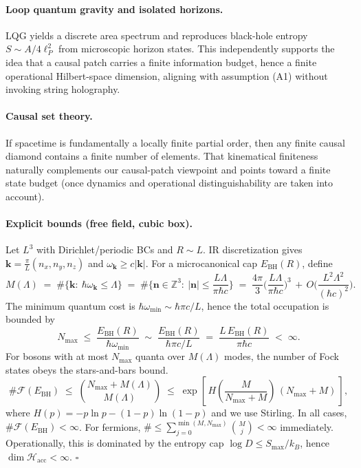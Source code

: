 \documentclass[12pt]{article}
\newcommand{\Smax}{S_{\max}}
\theoremstyle{remark}
\begin{document}
\paragraph{Loop quantum gravity and isolated horizons.}
LQG yields a discrete area spectrum and reproduces black-hole entropy $S\!\sim\!A/4\ell_P^2$ from microscopic horizon states. This independently supports the idea that a causal patch carries a finite information budget, hence a finite operational Hilbert-space dimension, aligning with assumption (A1) without invoking string holography.

\paragraph{Causal set theory.}
If spacetime is fundamentally a locally finite partial order, then any finite causal diamond contains a finite number of elements. That kinematical finiteness naturally complements our causal-patch viewpoint and points toward a finite state budget (once dynamics and operational distinguishability are taken into account).

\paragraph{Explicit bounds (free field, cubic box).}
Let $L^3$ with Dirichlet/periodic BCs and $R\sim L$. IR discretization gives 
$\mathbf{k}=\frac{\pi}{L}(n_x,n_y,n_z)$ and $\omega_{\mathbf{k}}\ge c|\mathbf{k}|$.
For a microcanonical cap $E_{\mathrm{BH}}(R)$, define 
\[
M(\Lambda)\;=\;\#\{\mathbf{k}:\ \hbar\omega_{\mathbf{k}}\le \Lambda\}
\;=\;\#\Big\{\mathbf{n}\in\mathbb{Z}^3:\ |\mathbf{n}|\le \frac{L\Lambda}{\pi\hbar c}\Big\}
\;=\;\frac{4\pi}{3}\Big(\frac{L\Lambda}{\pi\hbar c}\Big)^3 \,+\,O\Big(\frac{L^2\Lambda^2}{(\hbar c)^2}\Big).
\]
The minimum quantum cost is $\hbar\omega_{\min}\sim \hbar\pi c/L$, hence the total occupation is bounded by
\[
N_{\max}\;\le\;\frac{E_{\mathrm{BH}}(R)}{\hbar\omega_{\min}}
\;\sim\;\frac{E_{\mathrm{BH}}(R)}{\hbar\pi c/L}
\;=\;\frac{L\,E_{\mathrm{BH}}(R)}{\pi\hbar c}\;<\;\infty.
\]
For bosons with at most $N_{\max}$ quanta over $M(\Lambda)$ modes, the number of Fock states obeys the stars-and-bars bound.
\[
\#\mathcal{F}(E_{\mathrm{BH}})\;\le\;\binom{N_{\max}+M(\Lambda)}{M(\Lambda)}
\;\le\;\exp\!\left[\,H\!\left(\frac{M}{N_{\max}+M}\right)\,(N_{\max}+M)\,\right],
\]
where $H(p)=-p\ln p-(1-p)\ln(1-p)$ and we use Stirling. In all cases, $\#\mathcal{F}(E_{\mathrm{BH}})<\infty$.
For fermions, $\#\le \sum_{j=0}^{\min(M,N_{\max})}\binom{M}{j}<\infty$ immediately.
Operationally, this is dominated by the entropy cap $\log D\le \Smax/k_B$, hence $\dim\mathcal{H}_{\mathrm{acc}}<\infty$.
\hfill$\square$
\end{document}
